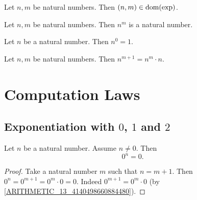 \documentclass[10pt]{article}
\begin{document}
  \begin{forthel}
    \begin{lemma}
      Let $n, m$ be natural numbers.
      Then $(n,m) \in \operatorname{dom}(\textrm{exp})$.
    \end{lemma}
  \end{forthel}

  \begin{forthel}
    \begin{lemma}
      Let $n, m$ be natural numbers.
      Then $n^{m}$ is a natural number.
    \end{lemma}
  \end{forthel}

  \begin{forthel}
    \begin{lemma}
      Let $n$ be a natural number.
      Then $n^{0} = 1$.
    \end{lemma}
  \end{forthel}

  \begin{forthel}
    \begin{lemma}
      Let $n, m$ be natural numbers.
      Then $n^{m + 1} = n^{m} \cdot n$.
    \end{lemma}
  \end{forthel}


  \section{Computation Laws}

  \subsection{Exponentiation with $0$, $1$ and $2$}

  \begin{forthel}
    \begin{proposition}
      Let $n$ be a natural number.
      Assume $n \neq 0$.
      Then \[ 0^{n} = 0. \]
    \end{proposition}
    \begin{proof}
      Take a natural number $m$ such that $n = m + 1$.
      Then $0^{n}
        = 0^{m + 1}
        = 0^{m} \cdot 0
        = 0$.
      Indeed $0^{m + 1} = 0^{m} \cdot 0$ (by \cref{ARITHMETIC_13_4140498660884480}).
    \end{proof}
  \end{forthel}
\end{document}
